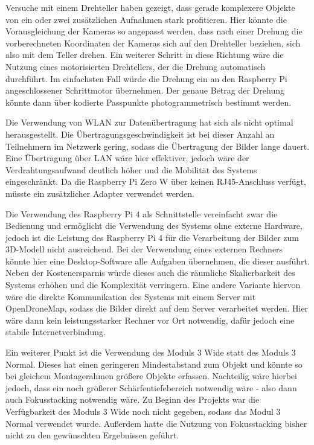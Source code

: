 \documentclass[./00PhotoBox.tex]{subfiles}
\begin{document}
Versuche mit einem Drehteller haben gezeigt, dass gerade komplexere Objekte von ein oder zwei zusätzlichen Aufnahmen stark profitieren. Hier könnte die Vorausgleichung der Kameras so angepasst werden, dass nach einer Drehung die vorberechneten Koordinaten der Kameras sich auf den Drehteller beziehen, sich also mit dem Teller drehen. Ein weiterer Schritt in diese Richtung wäre die Nutzung eines motorisierten Drehtellers, der die Drehung au\-to\-ma\-tisch durchführt. Im einfachsten Fall würde die Drehung ein an den Raspberry Pi angeschlossener Schrittmotor übernehmen. Der genaue Betrag der Drehung könnte dann über kodierte Passpunkte photogrammetrisch bestimmt werden.

Die Verwendung von WLAN zur Datenübertragung hat sich als nicht optimal herausgestellt. Die Übertragungsgeschwindigkeit ist bei dieser Anzahl an Teilnehmern im Netzwerk gering, sodass die Übertragung der Bilder lange dauert. Eine Übertragung über LAN wäre hier effektiver, jedoch wäre der Verdrahtungsaufwand deutlich höher und die Mobilität des Systems eingeschränkt. Da die Raspberry Pi Zero W über keinen RJ45-Anschluss verfügt, müsste ein zusätzlicher Adapter verwendet werden.

Die Verwendung des Raspberry Pi 4 als Schnittstelle vereinfacht zwar die Bedienung und ermöglicht die Verwendung des Systems ohne externe Hardware, jedoch ist die Leistung des Raspberry Pi 4 für die Verarbeitung der Bilder zum 3D-Modell nicht ausreichend. Bei der Verwendung eines externen Rechners könnte hier eine Desktop-Software alle Aufgaben übernehmen, die dieser ausführt. Neben der Kostenersparnis würde dieses auch die räumliche Skalierbarkeit des Systems erhöhen und die Komplexität verringern. Eine andere Variante hiervon wäre die direkte Kommunikation des Systems mit einem Server mit OpenDroneMap, sodass die Bilder direkt auf dem Server verarbeitet werden. Hier wäre dann kein leistungsstarker Rechner vor Ort notwendig, dafür jedoch eine stabile Internetverbindung.

Ein weiterer Punkt ist die Verwendung des Moduls 3 Wide statt des Moduls 3 Normal. Dieses hat einen geringeren Mindestabstand zum Objekt und könnte so bei gleichem Montagerahmen größere Objekte erfassen. Nachteilig wäre hierbei jedoch, dass ein noch größerer Schärfentiefebereich notwendig wäre - also dann auch Fokusstacking notwendig wäre. Zu Beginn des Projekts war die Verfügbarkeit des Moduls 3 Wide noch nicht gegeben, sodass das Modul 3 Normal verwendet wurde. Außerdem hatte die Nutzung von Fokusstacking bisher nicht zu den gewünschten Ergebnissen geführt.
\end{document}
